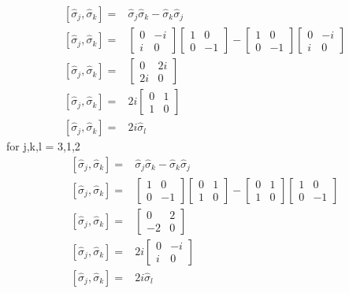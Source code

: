 \documentclass[12pt, a4paper]{article}
\begin{document}
\begin{align*}
\left[\hat{\sigma}_j,\hat{\sigma}_k\right] =& 
\hat{\sigma}_j\hat{\sigma}_k - \hat{\sigma}_k\hat{\sigma}_j
\\
\left[\hat{\sigma}_j,\hat{\sigma}_k\right] =& 
\begin{bmatrix}0&-i\\i&0\end{bmatrix}
\begin{bmatrix}1&0\\0&-1\end{bmatrix} -
\begin{bmatrix}1&0\\0&-1\end{bmatrix}
\begin{bmatrix}0&-i\\i&0\end{bmatrix}
\\
\left[\hat{\sigma}_j,\hat{\sigma}_k\right] =& \begin{bmatrix}0&2i\\ 2i&0\end{bmatrix}
\\
\left[\hat{\sigma}_j,\hat{\sigma}_k\right] =& 2i\begin{bmatrix}0&1\\ 1&0\end{bmatrix}
\\
\left[\hat{\sigma}_j,\hat{\sigma}_k\right] =& 2i\hat{\sigma}_l
\end{align*}
for j,k,l = 3,1,2
\begin{align*}
\left[\hat{\sigma}_j,\hat{\sigma}_k\right] =& 
\hat{\sigma}_j\hat{\sigma}_k - \hat{\sigma}_k\hat{\sigma}_j
\\
\left[\hat{\sigma}_j,\hat{\sigma}_k\right] =& 
\begin{bmatrix}1&0\\0&-1\end{bmatrix} 
\begin{bmatrix}0&1\\1&0\end{bmatrix} -
\begin{bmatrix}0&1\\1&0\end{bmatrix}
\begin{bmatrix}1&0\\0&-1\end{bmatrix} 
\\
\left[\hat{\sigma}_j,\hat{\sigma}_k\right] =& \begin{bmatrix}0&2\\ -2&0\end{bmatrix}
\\
\left[\hat{\sigma}_j,\hat{\sigma}_k\right] =& 2i\begin{bmatrix}0&-i\\ i&0\end{bmatrix}
\\
\left[\hat{\sigma}_j,\hat{\sigma}_k\right] =& 2i\hat{\sigma}_l
\end{align*}
\end{document}
